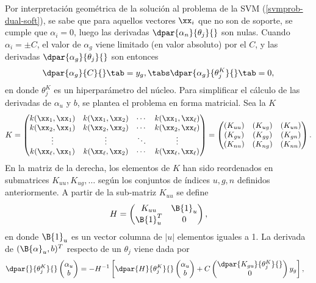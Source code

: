 %
Por interpretación geométrica de la solución al problema de la SVM
(\ref{svmprob-dual-soft}), se sabe que para aquellos vectores $\xx_i$
que no son de soporte, se cumple que $\alpha_i=0$, luego las derivadas
$\dpar{\alpha_n}{\theta_j}{}$ son nulas.
Cuando $\alpha_i=\pm{}C$, el valor de $\alpha_g$ viene limitado (en
valor absoluto) por el \hparam{} $C$, y las derivadas
$\dpar{\alpha_g}{\theta_j}{}$ son entonces
%
\begin{align}
  \dpar{\alpha_g}{C}{} \tab= y_g, \tabs
  \dpar{\alpha_g}{{\theta}^K_j}{} \tab= 0,
\end{align}
%
en donde $\theta_j^K$ es un hiperparámetro del núcleo.
Para simplificar el cálculo de las derivadas de $\alpha_u$ y $b$, se
plantea el problema en forma matricial.
Sea la  $K$
%
\begin{align}
  K = \begin{pmatrix} k(\xx_1,\xx_1) & k(\xx_1,\xx_2) & \cdots & k(\xx_1,\xx_\ell)
    \\ k(\xx_2,\xx_1) & k(\xx_2,\xx_2) & \cdots & k(\xx_2,\xx_\ell) \\ \vdots &
    \vdots & \ddots & \vdots \\ k(\xx_\ell,\xx_1) & k(\xx_\ell,\xx_2) & \cdots &
    k(\xx_\ell,\xx_\ell)
  \end{pmatrix}
  =
  \begin{pmatrix}
    (K_{uu}) & (K_{ug}) & (K_{un}) \\
    (K_{gu}) & (K_{gg}) & (K_{gn}) \\
    (K_{nu}) & (K_{ng}) & (K_{nn})
  \end{pmatrix}.
\end{align}
%
En la matriz de la derecha, los elementos de $K$ han sido reordenados
en submatrices $K_{uu},K_{ug},\ldots$ según los conjuntos de índices
$u, g, n$ definidos anteriormente.
A partir de la sub-matriz $K_{uu}$ se define
%
\begin{align}
  H=\begin{pmatrix} K_{uu} & \B{1}_u \\ \B{1}_u^T & 0
  \end{pmatrix},
\end{align}
%
en donde $\B{1}_u$ es un vector columna de $|u|$ elementos iguales a 1.
La derivada de $(\B{\alpha}_u,b)^T$ respecto de un \hparam{}
$\theta_j$ viene dada por
%
\begin{align}
  \dpar{}{\theta^K_j}{} \begin{pmatrix}\alpha_{u}\\b\end{pmatrix} &=
    -H^{-1} \left[
      \dpar{H}{\theta^K_j}{}
      \begin{pmatrix}\alpha_{u}\\b\end{pmatrix}
        +C \begin{pmatrix}\dpar{K_{gu}}{\theta^K_j}{}\\0\end{pmatrix}
          y_g
          \right],
\end{align}
